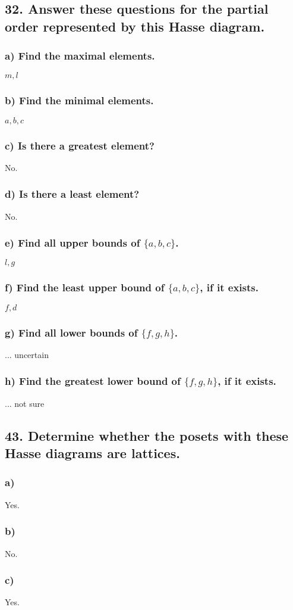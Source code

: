 \documentclass[11pt, oneside]{article} %
\numberwithin{equation}{section} %
\numberwithin{figure}{section} %
\numberwithin{table}{section} %
\begin{document}

\subsection{32. Answer these questions for the partial order represented by this Hasse diagram.}
\subsubsection{a) Find the maximal elements.}
$m,l$
\subsubsection{b) Find the minimal elements.}
$a,b,c$
\subsubsection{c) Is there a greatest element?}
No.
\subsubsection{d) Is there a least element?}
No.
\subsubsection{e) Find all upper bounds of $\{a, b, c\}$.}
$l,g$
\subsubsection{f) Find the least upper bound of $\{a,b,c\}$, if it exists.}
$f,d$
\subsubsection{g) Find all lower bounds of $\{f,g,h\}$.}
... uncertain
\subsubsection{h) Find the greatest lower bound of $\{f,g,h\}$, if it exists.}
... not sure


\subsection{43. Determine whether the posets with these Hasse diagrams are lattices.}
\subsubsection{a)}
Yes.
\subsubsection{b)}
No.
\subsubsection{c)}
Yes.

\end{document}
